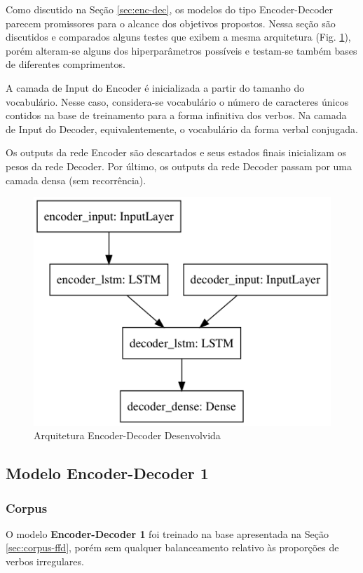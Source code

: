 Como discutido na Seção \ref{sec:enc-dec}, os modelos do tipo Encoder-Decoder parecem promissores para o alcance dos objetivos propostos. Nessa seção são discutidos e comparados alguns testes que exibem a mesma arquitetura (Fig. \ref{fig:encdec}), porém alteram-se alguns dos hiperparâmetros possíveis e testam-se também bases de diferentes comprimentos.

A camada de Input do Encoder é inicializada a partir do tamanho do vocabulário. Nesse caso, considera-se vocabulário o número de caracteres únicos contidos na base de treinamento para a forma infinitiva dos verbos. Na camada de Input do Decoder, equivalentemente, o vocabulário da forma verbal conjugada.

Os outputs da rede Encoder são descartados e seus estados finais inicializam os pesos da rede Decoder. Por último, os outputs da rede Decoder passam por uma camada densa (sem recorrência).


\begin{figure}[H]
  \centering
  \includegraphics[width=0.5\linewidth]{img/draw-model6.png}
  \caption{Arquitetura Encoder-Decoder Desenvolvida}
  \label{fig:encdec}
\end{figure}


\subsection{Modelo Encoder-Decoder 1} 

\subsubsection{Corpus}
O modelo \textbf{Encoder-Decoder 1} foi treinado na base apresentada na Seção \ref{sec:corpus-ffd}, porém sem qualquer balanceamento relativo às proporções de verbos irregulares.

